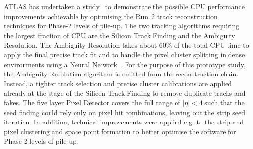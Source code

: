 ATLAS has undertaken a study~\cite{ATL-PHYS-PUB-2019-041} to demonstrate the possible CPU performance improvements achievable by optimising the Run~2 track reconstruction techniques for Phase-2 levels of pile-up. The two tracking algorithms requiring the largest fraction of CPU are the Silicon Track Finding and the Ambiguity Resolution. The Ambiguity Resolution takes about 60\% of the total CPU time to apply the final precise track fit and to handle the pixel cluster splitting in dense environments using a Neural Network~\cite{Aad:2014yva}. For the purpose of this prototype study, the Ambiguity Resolution algorithm is omitted from the reconstruction chain. Instead, a tighter track selection and precise cluster calibrations are applied already at the stage of the Silicon Track Finding to remove duplicate tracks and fakes.
The five layer Pixel Detector covers the full range of $|\eta| < 4$ such that the seed finding could rely only on pixel hit combinations, leaving out the strip seed iteration.
In addition, technical improvements were applied e.g. to the strip and pixel clustering and space point formation to better optimise the software for Phase-2 levels of pile-up.

